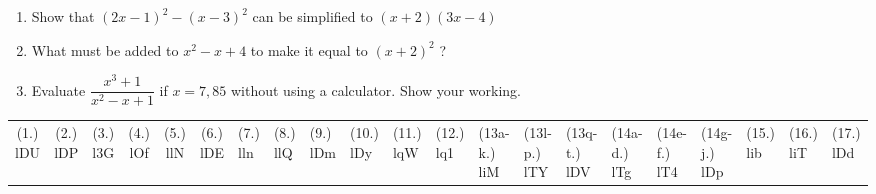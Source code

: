 \begin{eocexercises}{}
\begin{enumerate}[itemsep=5pt, label=\textbf{\arabic*}. ]
\item Show that ${(2x-1)}^{2}-{(x-3)}^{2}$ can be simplified to $(x+2)(3x-4)$

\item What must be added to ${x}^{2}-x+4$ to make it equal to ${(x+2)}^{2}$ ?
\item Evaluate $\dfrac{x^{3}+1}{x^{2}-x+1}$ if $x=7,85$ without using a calculator. Show your working.
\end{enumerate}
\practiceinfo 
\par 
 \par \begin{tabular}[h]{cccccc}
 (1.) lDU  &  (2.) lDP  &  (3.) l3G  & (4.) lOf & (5.) llN & (6.) lDE &
 (7.) lln  &  (8.) llQ  &  (9.) lDm  & (10.) lDy & (11.) lqW & (12.) lq1 &
 (13a-k.)  liM  &  (13l-p.) lTY  &  (13q-t.) lDV  & (14a-d.) lTg & (14e-f.) lT4 & (14g-j.) lDp &
 (15.) lib  &  (16.) liT  &  (17.) lDd    \end{tabular}
\end{eocexercises}
